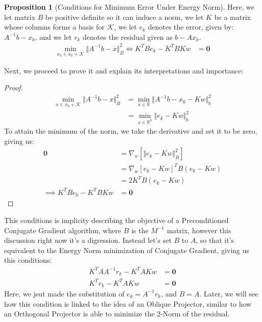 \documentclass[]{article}
\theoremstyle{definition}
\newtheorem{prop}{Proposition}[section]  %
\begin{document}
            \begin{prop}[Conditions for Minimum Error Under Energy Norm]
                Here, we let matrix $B$ be positive definite so it can induce a norm, we let $K$ be a matrix whose columns forms a basis for $\mathcal K$, we let $e_k$ denotes the error, given by: $A^{-1}b - x_k$, and we let $r_k$ denotes the residual given as $b - Ax_k$. 
                \begin{align}
                    \min_{x_k\in x_0 + \mathcal K}\Vert A^{-1}b - x\Vert_B^2
                    \iff
                    K^TBe_k - K^TBKw &= \mathbf 0
                \end{align} 
            \end{prop}
            Next, we proceed to prove it and explain its interpretations and importance: 
            \begin{proof}
                \begin{align}
                    \min_{x \in x_0 + \mathcal K}
                    \Vert A^{-1}b - x\Vert_B^2
                    &= 
                    \min_{x\in \mathbb R} 
                    \Vert A^{-1}b - x_0 - Kw\Vert_b^2
                    \\
                    &= \min_{x\in \mathbb R^k}
                    \Vert e_k - Kw\Vert_b^2
                \end{align}
                To attain the minimum of the norm, we take the derivative and set it to be zero, giving us: 
                \begin{align}
                    \mathbf 0 &= \nabla_w[\Vert e_k - Kw\Vert_B^2]
                    \\
                    &= \nabla_w[e_k - Kw]^TB(e_k - Kw)
                    \\
                    &= 2K^TB(e_k - Kw)
                    \\
                    \implies 
                    K^TBe_k - K^TBKw &= \mathbf 0
                \end{align}
            \end{proof}
            This conditions is implicity describing the objective of a Preconditioned Conjugate Gradient algorithm, where $B$ is the $M^{-1}$ matrix, however this discussion right now it's a digression. Instead let's set $B$ to $A$, so that it's equivalent to the Energy Norm minimization of Conjugate Gradient, giving us this conditions: 
            \begin{align}
                K^TAA^{-1}r_k - K^TAKw &= \mathbf 0
                \\
                K^Tr_k - K^TAKw &= \mathbf 0
            \end{align}
            Here, we jsut made the substitution of $e_k = A^{-1}r_k$, and $B = A$. Later, we will see how this condition is linked to the idea of an Oblique Projector, similar to how an Orthogonal Projector is able to minimize the 2-Norm of the residual. 
\end{document}
